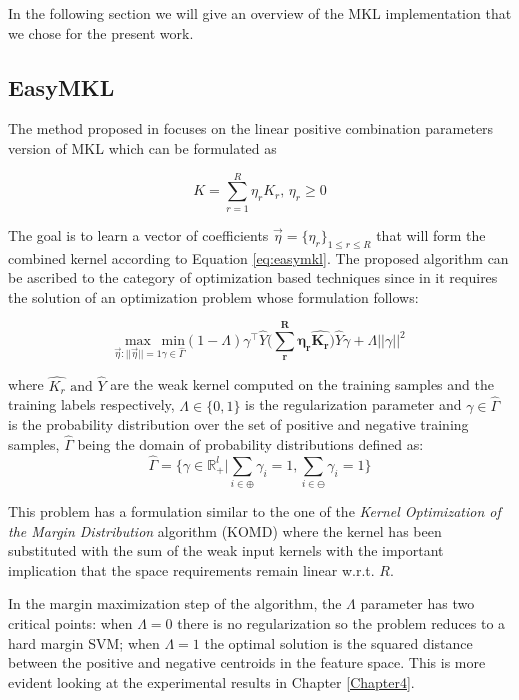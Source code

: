 In the following section we will give an overview of the MKL implementation
that we chose for the present work.

\subsection{EasyMKL}
\label{subsec:easymkl}

The method proposed in \cite{aiolli2015easymkl} focuses on the linear positive combination
parameters version of MKL which can be formulated as

\begin{equation}
    K = \sum_{r=1}^R \eta_rK_r,\, \eta_r \geq 0
    \label{eq:easymkl}
\end{equation}

The goal is to learn a vector of coefficients $\vec{\eta}=\{\eta_r\}_{1\leq r \leq R}$ that will form the
combined kernel according to Equation \ref{eq:easymkl}.
The proposed algorithm can be ascribed to the category of optimization based
techniques since in it requires the solution of an optimization problem whose
formulation follows:

\begin{equation}
    \underset{\vec{\eta}:||\vec{\eta}||=1}{\mathrm{max}}\underset{\gamma \in \hat{\Gamma}}{\mathrm{min}}(1-\Lambda)\gamma^\top\hat{Y}\Big(\boldsymbol{\sum_r^R \eta_r\hat{K_r}}\Big)\hat{Y}\gamma+\Lambda||\gamma||^2
    \label{eq:easymin}
\end{equation}

where $\hat{K_r}\text{ and }\hat{Y}$ are the weak kernel computed on the training samples
and the training labels respectively, $\Lambda \in \{0,1\}$ is the regularization
parameter and $\gamma \in \hat{\Gamma}$ is the probability distribution over the set of positive and
negative training samples, $\hat{\Gamma}$ being the domain of probability distributions defined as:
\[ \hat{\Gamma} = \Big\{ \gamma \in \mathbb{R}^l_+ | \sum_{i \in \oplus} \gamma_i = 1, \sum_{i \in \ominus} \gamma_i = 1 \Big\} \]

This problem has a formulation similar to the one of the \emph{Kernel Optimization of the
Margin Distribution} algorithm (KOMD) \cite{Aiolli2008} where the kernel has been
substituted with the sum of the weak input kernels with the important implication
that the space requirements remain linear w.r.t. $R$.

In the margin maximization step of the algorithm, the $\Lambda$ parameter
has two critical points: when $\Lambda = 0$ there is no regularization so the
problem reduces to a hard margin SVM; when $\Lambda = 1$ the optimal solution is
the squared distance between the positive and negative centroids in the feature
space.
This is more evident looking at the experimental results in Chapter
\ref{Chapter4}.

